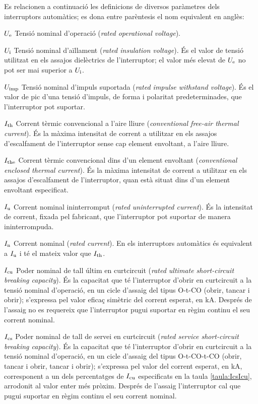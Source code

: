 Es relacionen a continuació les definicions de diversos paràmetres dels interruptors automàtics; es dona entre parèntesis el nom equivalent en anglès:
\begin{list}{}
   {\setlength{\labelwidth}{10mm} \setlength{\leftmargin}{15mm} \setlength{\labelsep}{5mm}}
   \item[$U_\mathrm{e}$] Tensió nominal d'operació (\textit{rated operational voltage}).
   \item[$U_\mathrm{i}$] Tensió nominal d'aïllament (\textit{rated insulation voltage}). És el valor de tensió utilitzat en els assajos dielèctrics de l'interruptor;  el valor més elevat de $U_\mathrm{e}$ no pot ser mai superior a $U_\mathrm{i}$.
    \item[$U_\mathrm{imp}$] Tensió nominal d'impuls suportada (\textit{rated impulse withstand voltage}). És el valor de pic d'una tensió d'impuls, de forma i polaritat predeterminades, que l'interruptor pot suportar.
   \item[$I_\mathrm{th}$] Corrent tèrmic convencional a l'aire lliure (\textit{conventional free-air thermal current}).  És la  màxima intensitat de corrent a utilitzar en els assajos d'escalfament de l'interruptor sense cap element envoltant, a l'aire lliure.
   \item[$I_\mathrm{the}$] Corrent tèrmic convencional dins d'un element envoltant (\textit{conventional enclosed thermal current}).  És la màxima intensitat de corrent a utilitzar en els assajos d'escalfament de l'interruptor, quan està situat dins d'un element envoltant especificat.
    \item[$I_\mathrm{u}$] Corrent nominal ininterromput (\textit{rated uninterrupted current}).  És la intensitat  de corrent, fixada pel fabricant, que l'interruptor pot suportar de manera ininterrompuda.
    \item[$I_\mathrm{n}$] Corrent nominal (\textit{rated current}).  En els interruptors automàtics és equivalent a $I_\mathrm{u}$ i té el mateix valor que $I_\mathrm{th}$.
    \item[$I_\mathrm{cu}$] Poder nominal de tall últim en curtcircuit (\textit{rated ultimate  short-circuit breaking capacity}). És la capacitat que té l'interruptor d'obrir en curtcircuit a la tensió nominal d'operació, en un cicle d'assaig del tipus O-t-CO (obrir, tancar i obrir); s'expressa pel valor eficaç simètric del corrent esperat, en kA. Després de l'assaig no es requereix que l'interruptor pugui suportar en règim continu el seu corrent nominal.
    \item[$I_\mathrm{cs}$] Poder nominal de tall de servei en curtcircuit (\textit{rated service  short-circuit breaking capacity}). És la capacitat que té l'interruptor d'obrir en curtcircuit a la tensió nominal d'operació, en un cicle d'assaig del tipus O-t-CO-t-CO (obrir, tancar i obrir, tancar i obrir); s'expressa pel valor  del corrent esperat, en kA, corresponent a un dels percentatges de $I_\mathrm{cu}$ especificats en la taula \vref{taula:IcsIcu}, arrodonit al valor enter més pròxim. Després de l'assaig l'interruptor cal que pugui suportar en règim continu  el seu corrent nominal.


\end{list}
